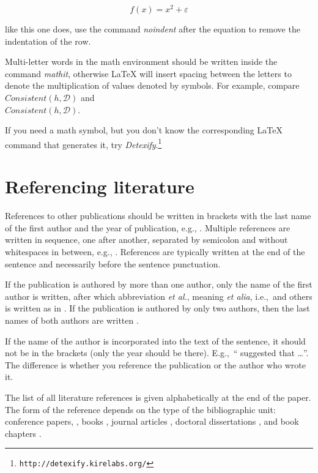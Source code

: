 \documentclass[10pt, a4paper]{article}
\begin{document}
\begin{equation}
f(x) = x^2 + \varepsilon
\end{equation}

\noindent like this one does, use the command \emph{noindent} after the equation to remove the indentation of the row. 

Multi-letter words in the math environment should be written inside the command \emph{mathit}, otherwise \LaTeX{} will insert spacing between the letters to denote the multiplication of values denoted by symbols. For example, compare
$\mathit{Consistent}(h,\mathcal{D})$ and\\
$Consistent(h,\mathcal{D})$.

If you need a math symbol, but you don't know the corresponding \LaTeX{} command that generates it, try
\emph{Detexify}.\footnote{\texttt{http://detexify.kirelabs.org/}}

\section{Referencing literature}

References to other publications should be written in brackets with the last name of the first author and the year of publication, e.g., \citep{chomsky-73}.  Multiple references are written in sequence, one after another, separated by semicolon and without whitespaces in between, e.g., \citep{chomsky-73,chave-64,feigl-58}. References are typically written at the end of the sentence and necessarily before the sentence punctuation.

If the publication is authored by more than one author, only the name of the first author is written, after which abbreviation \emph{et al.}, meaning \emph{et alia}, i.e.,~and others is written as in \citep{johnson-etc}. If the publication is authored by only two authors, then the last names of both authors are written \citep{johnson-howells}.

If the name of the author is incorporated into the text of the sentence, it should not be in the brackets (only the year should be there). E.g.,~``\citet{chomsky-73}
suggested that \dots''. The difference is whether you reference the publication or the author who wrote it. 

The list of all literature references is given alphabetically at the end of the paper. The form of the reference depends on the type of the bibliographic unit: conference papers,
\citep{chave-64}, books \citep{butcher-81}, journal articles
\citep{howells-51}, doctoral dissertations \citep{croft-78}, and book chapters \citep{feigl-58}. 
\end{document}
